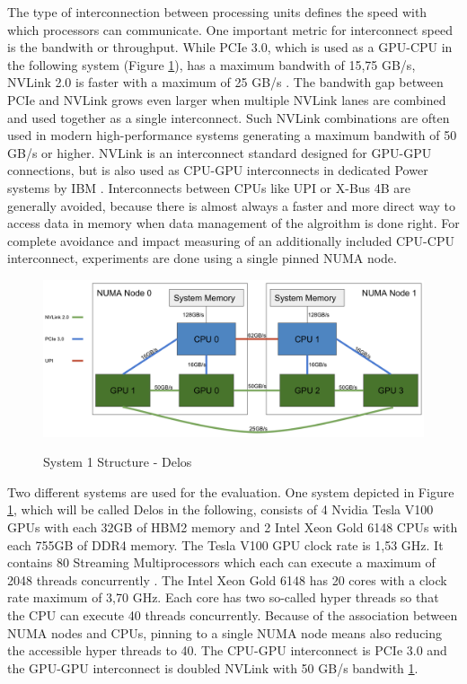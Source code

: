 The type of interconnection between processing units defines the speed with which processors can communicate. One important metric for interconnect speed is the bandwith or throughput. While PCIe 3.0, which is used as a GPU-CPU in the following system (Figure \ref{fig:delos_arch}), has a maximum bandwith of 15,75 GB/s, NVLink 2.0 is faster with a maximum of 25 GB/s \cite{zargesEvaluationOnNodeGPU}. The bandwith gap between PCIe and NVLink grows even larger when multiple NVLink lanes are combined and used together as a single interconnect. Such NVLink combinations are often used in modern high-performance systems generating a maximum bandwith of 50 GB/s or higher. NVLink is an interconnect standard designed for GPU-GPU connections, but is also used as CPU-GPU interconnects in dedicated Power systems by IBM \cite{liEvaluatingModernGPU2020}. Interconnects between CPUs like UPI or X-Bus 4B are generally avoided, because there is almost always a faster and more direct way to access data in memory when data management of the algroithm is done right. For complete avoidance and impact measuring of an additionally included CPU-CPU interconnect, experiments are done using a single pinned NUMA node.

\begin{figure}[H]
  \caption{System 1 Structure - Delos}
  \includegraphics[width=\textwidth]{figures/delos_system_arch.png}
  \centering
  \label{fig:delos_arch}
\end{figure}

Two different systems are used for the evaluation. One system depicted in Figure \ref{fig:delos_arch}, which will be called Delos in the following, consists of 4 Nvidia Tesla V100 GPUs with each 32GB of HBM2 memory and 2 Intel Xeon Gold 6148 CPUs with each 755GB of DDR4 memory. The Tesla V100 GPU clock rate is 1,53 GHz. It contains 80 Streaming Multiprocessors which each can execute a maximum of 2048 threads concurrently \cite{NVIDIATESLAV1002017}. The Intel Xeon Gold 6148 has 20 cores with a clock rate maximum of 3,70 GHz. Each core has two so-called hyper threads so that the CPU can execute 40 threads concurrently. Because of the association between NUMA nodes and CPUs, pinning to a single NUMA node means also reducing the accessible hyper threads to 40. The CPU-GPU interconnect is PCIe 3.0 and the GPU-GPU interconnect is doubled NVLink with 50 GB/s bandwith \ref{fig:delos_arch}.


